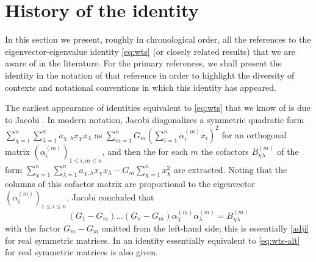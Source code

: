 \documentclass{amsart}
\begin{document}
\section{History of the identity}\label{history-sec}

In this section we present, roughly in chronological order, all the references to the eigenvector-eigenvalue identity \eqref{eq:wts} (or closely related results) that we are aware of in the literature.  For the primary references, we shall present the identity in the notation of that reference in order to highlight the diversity of contexts and notational conventions in which this identity has appeared.
 
The earliest appearance of identities equivalent to \eqref{eq:wts} that we know of is due to Jacobi \cite[\S 8, (33)]{jacobi}.  In modern notation, Jacobi diagonalizes a symmetric quadratic form $\sum_{\chi=1}^n \sum_{\lambda=1}^n a_{\chi,\lambda} x_\chi x_\lambda$ as $\sum_{m=1}^n G_m (\sum_{i=1}^n \alpha_i^{(m)} x_i)^2$ for an orthogonal matrix $(\alpha_i^{(m)})_{1 \leq i,m \leq n}$, and then the for each $m$ the cofactors $B^{(m)}_{\chi \lambda}$ of the form $\sum_{\chi=1}^n \sum_{\lambda=1}^n a_{\chi,\lambda} x_\chi x_\lambda - G_m \sum_{\chi=1}^n x_\chi^2$ are extracted.  Noting that the columns of this cofactor matrix are proportional to the eigenvector $(\alpha_i^{(m)})_{1 \leq i \leq n}$, Jacobi concluded that
\begin{equation}\label{denom}
(G_1-G_m) \dots (G_n-G_m) \alpha_\chi^{(m)} \alpha_\lambda^{(m)} = B_{\chi\lambda}^{(m)}
\end{equation}
with the factor $G_m-G_m$ omitted from the left-hand side; this is essentially \eqref{adji} for real symmetric matrices. In \cite[\S 8, (36)]{jacobi} an identity essentially equivalent to \eqref{eq:wts-alt} for real symmetric matrices is also given.
 
\end{document}
